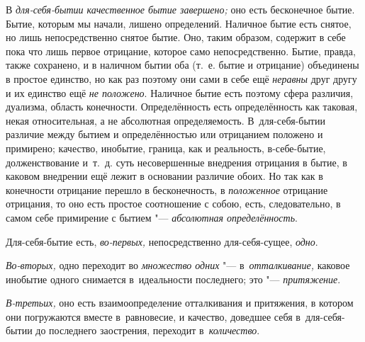 В {\em для-себя-бытии качественное бытие завершено;} оно
есть бесконечное бытие. Бытие, которым мы начали, лишено определений.
Наличное бытие есть снятое, но лишь непосредственно снятое бытие. Оно,
таким образом, содержит в себе пока что лишь первое отрицание, которое само
непосредственно. Бытие, правда, также сохранено, и в наличном бытии оба
(т.~е. бытие и отрицание) объединены в простое единство, но как раз поэтому
они сами в себе ещё {\em неравны} друг другу и их
единство ещё {\em не положено}. Наличное бытие есть
поэтому сфера различия, дуализма, область конечности. Определённость
есть определённость как таковая, некая относительная, а не абсолютная
определяемость. В~для-себя-бытии различие между бытием и определённостью
или отрицанием положено и примирено; качество, инобытие, граница, как и
реальность, в-себе-бытие, долженствование и~т.~д. суть несовершенные
внедрения отрицания в бытие, в каковом внедрении ещё лежит в основании
различие обоих. Но так как в конечности отрицание перешло в бесконечность,
в {\em положенное} отрицание отрицания, то оно есть
простое соотношение с собою, есть, следовательно, в самом себе примирение с
бытием "--- {\em абсолютная определённость}.

Для-себя-бытие есть, {\em во-первых,} непосредственно
для-себя-сущее, {\em одно}.

{\em Во-вторых,} одно переходит во {\em множество одних} "---
в~{\em отталкивание,} каковое инобытие одного снимается
в~идеальности последнего; это "--- {\em притяжение}.

{\em В-третьих,} оно есть взаимоопределение отталкивания и притяжения,
в котором они погружаются вместе в~равновесие, и качество, доведшее себя
в~для-себя-бытии до последнего заострения, переходит в~{\em количество}.



